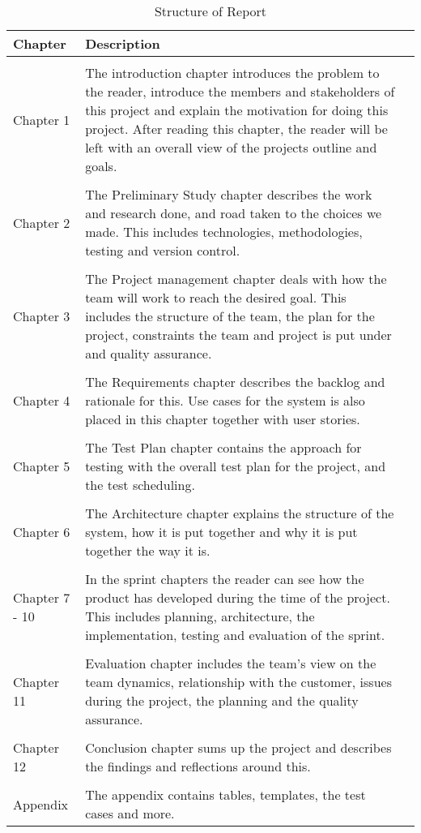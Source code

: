 \begin{table}
\centering
\begin{tabularx}{\textwidth}{ l X l }
  \textbf{Chapter}      & \textbf{Description} \\
  \hline \\ [-1.5ex]
  Chapter 1   & The introduction chapter introduces the problem to the reader, introduce the members and stakeholders of this project and explain the motivation for doing this project. After reading this chapter, the reader will be left with an overall view of the projects outline and goals. \vspace*{0.7ex} \\
  \hline \\ [-1.5ex]
  Chapter 2                   & The Preliminary Study chapter describes the work and research done, and road taken to the choices we made. This includes technologies, methodologies, testing and version control. \\
  \hline \\ [-1.5ex]
  Chapter 3          & The Project management chapter deals with how the team will work to reach the desired goal. This includes the structure of the team, the plan for the project, constraints the team and project is put under and quality assurance. \\
  \hline \\ [-1.5ex]
  Chapter 4   & The Requirements chapter describes the backlog and rationale for this. Use cases for the system is also placed in this chapter together with user stories. \\
  \hline \\ [-1.5ex]
  Chapter 5                    & The Test Plan chapter contains the approach for testing with the overall test plan for the project, and the test scheduling. \\
  \hline \\ [-1.5ex]
  Chapter 6              & The Architecture chapter explains the structure of the system, how it is put together and why it is put together the way it is. \\
  \hline \\ [-1.5ex]
  Chapter 7 - 10              & In the sprint chapters the reader can see how the product has developed during the time of the project. This includes planning, architecture, the implementation, testing and evaluation of the sprint. \\
  \hline \\ [-1.5ex]
  Chapter 11              & Evaluation chapter includes the team's view on the team dynamics, relationship with the customer, issues during the project, the planning and the quality assurance. \\
  \hline \\ [-1.5ex]
  Chapter 12              & Conclusion chapter sums up the project and describes the findings and reflections around this. \\
  \hline \\ [-1.5ex]
  Appendix              & The appendix contains tables, templates, the test cases and more. \\
\end{tabularx}
\caption{Structure of Report}
\label{table-reportstructure}
\end{table}
